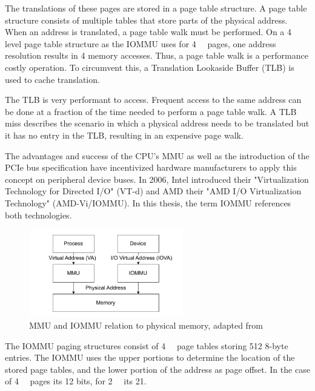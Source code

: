The translations of these pages are stored in a page table structure. A page table structure consists of multiple tables that store parts of the physical address. When an address is translated, a page table walk must be performed. On a 4 level page table structure as the IOMMU uses for \qty{4}{\kibi\byte} pages, one address resolution results in 4 memory accesses. Thus, a page table walk is a performance costly operation. To circumvent this, a Translation Lookaside Buffer (TLB) is used to cache translation.

The TLB is very performant to access. Frequent access to the same address can be done at a fraction of the time needed to perform a page table walk. A TLB miss describes the scenario in which a physical address needs to be translated but it has no entry in the TLB, resulting in an expensive page walk.

The advantages and success of the CPU's MMU as well as the introduction of the PCIe bus specification have incentivized hardware manufacturers to apply this concept on peripheral device buses. In 2006, Intel introduced their "Virtualization Technology for Directed I/O" (VT-d) and AMD their "AMD I/O Virtualization Technology" (AMD-Vi/IOMMU). In this thesis, the term IOMMU references both technologies.

\begin{figure}
    \centering
    \includegraphics[width=0.6\textwidth]{figures/MMUIOMMU.pdf}
    \caption{MMU and IOMMU relation to physical memory, adapted from \cite{iommuscalability}}
    \label{fig:mmuvsiommu}
\end{figure}

The IOMMU paging structures consist of \qty{4}{\kibi\byte} page tables storing 512 8-byte entries. The IOMMU uses the upper portions to determine the location of the stored page tables, and the lower portion of the address as page offset. In the case of \qty{4}{\kibi\byte} pages its 12 bits, for \qty{2}{\mebi\byte} its 21.

